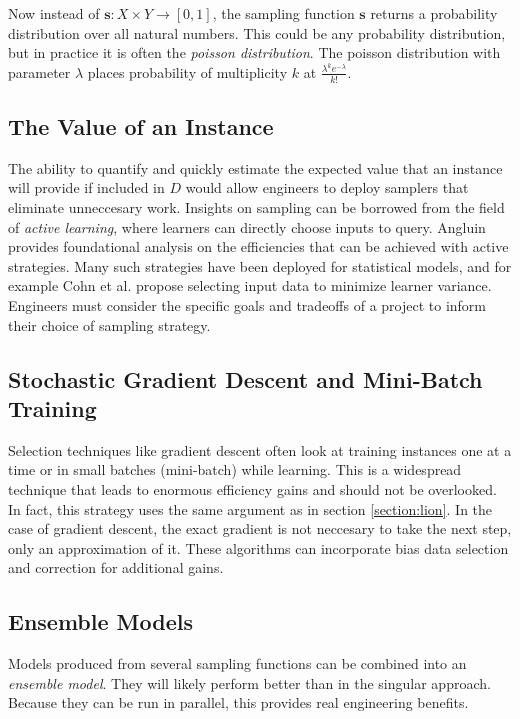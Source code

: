 \documentclass[twoside]{article}
\begin{document}
Now instead of \(\mathbf{s}: X \times Y \rightarrow \left [ 0, 1\right ]\), the sampling function \(\mathbf{s}\) returns a probability distribution over all natural numbers. This could be any probability distribution, but in practice it is often the \textit{poisson distribution}. The poisson distribution with parameter \(\lambda\) places probability of multiplicity \(k\) at \(\frac{\lambda^k e^{-\lambda}}{k!}\).

\subsection{The Value of an Instance}

The ability to quantify and quickly estimate the expected value that an instance will provide if included in \(D\) would allow engineers to deploy samplers that eliminate unneccesary work. Insights on sampling can be borrowed from the field of \textit{active learning}, where learners can directly choose inputs to query. Angluin\cite{angluin} provides foundational analysis on the efficiencies that can be achieved with active strategies. Many such strategies have been deployed for statistical models, and for example Cohn et al.\cite{active} propose selecting input data to minimize learner variance. Engineers must consider the specific goals and tradeoffs of a project to inform their choice of sampling strategy.

\subsection{Stochastic Gradient Descent and Mini-Batch Training}

Selection techniques like gradient descent often look at training instances one at a time or in small batches (mini-batch) while learning. This is a widespread technique that leads to enormous efficiency gains and should not be overlooked. In fact, this strategy uses the same argument as in section \ref{section:lion}. In the case of gradient descent, the exact gradient is not neccesary to take the next step, only an approximation of it. These algorithms can incorporate bias data selection and correction for additional gains.

\subsection{Ensemble Models}

Models produced from several sampling functions can be combined into an \textit{ensemble model}. They will likely perform better than in the singular approach. Because they can be run in parallel, this provides real engineering benefits.
\end{document}
